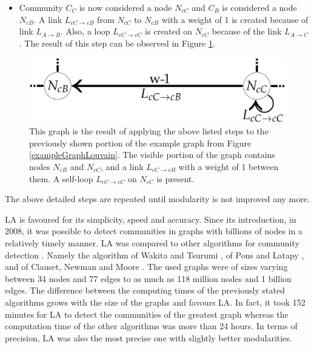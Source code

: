 \begin{enumerate} [label=\alph*)]
  \label{LA5}
  \begin{itemize}
    \item Community $C_{C}$ is now considered a node $N_{cC}$ and $C_{B}$ is considered a node $N_{cB}$. A link $L_{cC\rightarrow cB}$ from $N_{cC}$ to $N_{cB}$ with a weight of 1 is created because  of link $L_{A\rightarrow B}$. Also, a loop $L_{cC\rightarrow cC}$ is created on $N_{cC}$ because of the link $L_{A\rightarrow C}$. The result of this step can be observed in Figure \ref{exampleGraphLouvainEnde}.
  \end{itemize}  
  \begin{figure}[ht!]
    \centering
    \includegraphics[width=\textwidth]{Images/graphForCommunityEnde.png}
    \caption{This graph is the result of applying the above listed steps to the previously shown portion of the example graph from Figure \ref{exampleGraphLouvain}. The visible portion of the graph contains nodes $N_{cB}$ and $N_{cC}$, and a link $L_{cC\rightarrow cB}$ with a weight of 1 between them. A self-loop $L_{cC\rightarrow cC}$ on $N_{cC}$ is present.}
    \label{exampleGraphLouvainEnde}
\end{figure}     
\end{enumerate}
The above detailed steps are repeated until modularity is not improved any more.

LA is favoured for its simplicity, speed and accuracy. Since its introduction, in 2008, it was possible to detect communities in graphs with billions of nodes in a relatively timely manner. LA was compared to other algorithms for community detection \cite{louvainAlgorithm}.  Namely the algorithm of Wakita and Tsurumi \cite{wakitaAndToshiyuki}, of Pons and Latapy \cite{ponsAndLatapy}, and of Clauset, Newman and Moore \cite{CNM}. The used graphs were of sizes varying between 34 nodes and 77 edges to as much as 118 million nodes and 1 billion edges. The difference between the computing times of the previously stated algorithms grows with the size of the graphs and favours LA. In fact, it took 152 minutes for LA to detect the communities of the greatest graph whereas the computation time of the other algorithms was more than 24 hours. In terms of precision, LA was also the most precise one with slightly better modularities.


